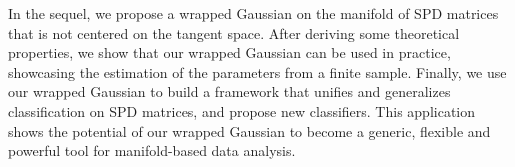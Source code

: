 In the sequel, we propose a  wrapped Gaussian on the manifold of SPD matrices that is not centered on the tangent space. After deriving some theoretical properties, we show that our wrapped Gaussian can be used in practice, showcasing the estimation of the parameters from a finite sample. Finally, we use our wrapped Gaussian to build a framework that unifies and generalizes classification on SPD matrices, and propose new classifiers. This application shows the potential of our wrapped Gaussian to become a generic, flexible and powerful tool for manifold-based data analysis.